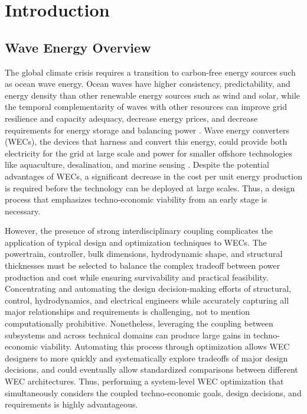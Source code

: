 \section{Introduction}
\label{intro}
\subsection{Wave Energy Overview}

The global climate crisis requires a transition to carbon-free energy sources such as ocean wave energy. Ocean waves have higher consistency, predictability, and energy density than other renewable energy sources such as wind and solar, while the temporal complementarity of waves with other resources can improve grid resilience and capacity adequacy, decrease energy prices, and decrease requirements for energy storage and balancing power \cite{akdemir_opportunities_2023,bhattacharya_timing_2021,pennock_temporal_2022}. Wave energy converters (WECs), the devices that harness and convert this energy, could provide both electricity for the grid at large scale and power for smaller offshore technologies like aquaculture, desalination, and marine sensing \cite{PBE}. Despite the potential advantages of WECs, a significant decrease in the cost per unit energy production is required before the technology can be deployed at large scales. %
Thus, a design process that emphasizes techno-economic viability from an early stage is necessary.

However, the presence of strong interdisciplinary coupling complicates the application of typical design and optimization techniques to WECs. The powertrain, controller, bulk dimensions, hydrodynamic shape, and structural thicknesses must be selected to balance the complex tradeoff between power production and cost while ensuring survivability and practical feasibility. Concentrating and automating the design decision-making efforts of structural, control, hydrodynamics, and electrical engineers while accurately capturing all major relationships and requirements is challenging, not to mention computationally prohibitive. Nonetheless, leveraging the coupling between subsystems and across technical domains can produce large gains in techno-economic viability. Automating this process through optimization allows WEC designers to more quickly and systematically explore tradeoffs of major design decisions, and could eventually allow standardized comparisons between different WEC architectures. Thus, performing a system-level WEC optimization that simultaneously considers the coupled techno-economic goals, design decisions, and requirements is highly advantageous.

